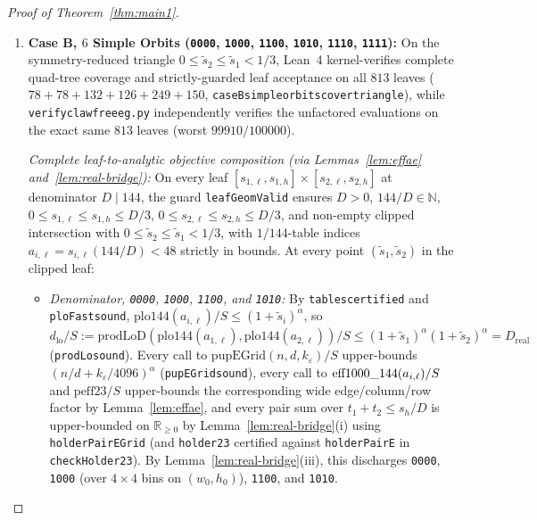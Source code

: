 \documentclass[11pt,reqno]{amsart}
\theoremstyle{plain}
\theoremstyle{definition}
\theoremstyle{remark}
\DeclareRobustCommand{\_}{\ifmmode\text{\textunderscore}\else\textunderscore\allowbreak\fi}
\begin{document}
\begin{proof}[Proof of Theorem~\ref{thm:main1}]
\begin{enumerate}[label=(\alph*),leftmargin=2em]
  \item \textbf{Case B, $6$ Simple Orbits (\texttt{0000}, \texttt{1000}, \texttt{1100}, \texttt{1010}, \texttt{1110}, \texttt{1111}):} On the symmetry-reduced triangle $0 \le \tilde{s}_2 \le \tilde{s}_1 < 1/3$, Lean~4 kernel-verifies complete quad-tree coverage and strictly-guarded leaf acceptance on all $813$ leaves ($78 + 78 + 132 + 126 + 249 + 150$, \texttt{caseB\_simple\_orbits\_cover\_triangle}), while \texttt{verify\_clawfree\_eg.py} independently verifies the unfactored evaluations on the exact same $813$ leaves (worst $99910/100000$).
  
  \emph{Complete leaf-to-analytic objective composition (via Lemmas~\ref{lem:effae} and~\ref{lem:real-bridge}):} On every leaf $[s_{1,\ell}, s_{1,h}] \times [s_{2,\ell}, s_{2,h}]$ at denominator $D \mid 144$, the guard \texttt{leafGeomValid} ensures $D > 0$, $144/D \in \mathbb{N}$, $0 \le s_{1,\ell} \le s_{1,h} \le D/3$, $0 \le s_{2,\ell} \le s_{2,h} \le D/3$, and non-empty clipped intersection with $0 \le \tilde{s}_2 \le \tilde{s}_1 < 1/3$, with $1/144$-table indices $a_{i,\ell} = s_{i,\ell} (144/D) < 48$ strictly in bounds. At every point $(\tilde{s}_1, \tilde{s}_2)$ in the clipped leaf:
  \begin{itemize}[leftmargin=1.4em]
    \item \emph{Denominator, \texttt{0000}, \texttt{1000}, \texttt{1100}, and \texttt{1010}:} By \texttt{tables\_144\_certified} and \texttt{ploFast\_sound}, $\mathrm{plo144}(a_{i,\ell}) / S \le (1 + \tilde{s}_i)^\alpha$, so $d_{\mathrm{lo}} / S := \mathrm{prodLoD}(\mathrm{plo144}(a_{1,\ell}), \mathrm{plo144}(a_{2,\ell})) / S \le (1 + \tilde{s}_1)^\alpha (1 + \tilde{s}_2)^\alpha = D_{\mathrm{real}}$ (\texttt{prodLo\_sound}). Every call to $\mathrm{pupEGrid}(n, d, k_\varepsilon) / S$ upper-bounds $(n/d + k_\varepsilon/4096)^\alpha$ (\texttt{pupEGrid\_sound}), every call to $\mathrm{eff1000\_144}(a_{i,\ell}) / S$ and $\mathrm{peff23} / S$ upper-bounds the corresponding wide edge/column/row factor by Lemma~\ref{lem:effae}, and every pair sum over $t_1 + t_2 \le s_h/D$ is upper-bounded on $\mathbb{R}_{\ge 0}$ by Lemma~\ref{lem:real-bridge}(i) using \texttt{holderPairEGrid} (and \texttt{holder23\_144} certified against \texttt{holderPairE} in \texttt{checkHolder23}). By Lemma~\ref{lem:real-bridge}(iii), this discharges \texttt{0000}, \texttt{1000} (over $4 \times 4$ bins on $(w_0, h_0)$), \texttt{1100}, and \texttt{1010}.

\end{itemize}
\end{enumerate}
\end{proof}
\end{document}
